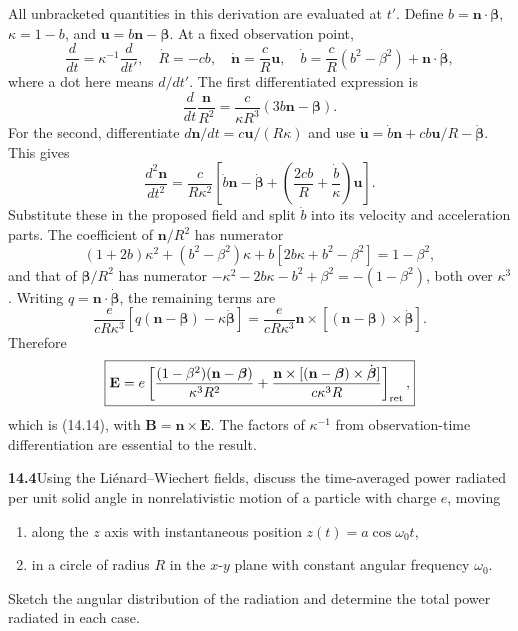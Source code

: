 All unbracketed quantities in this derivation are evaluated at $t'$.
Define $b=\mathbf n\cdot\boldsymbol\beta$, $\kappa=1-b$, and
$\mathbf u=b\mathbf n-\boldsymbol\beta$. At a fixed observation point,
\[
\frac d{dt}=\kappa^{-1}\frac d{dt'},\quad
\dot R=-cb,\quad \dot{\mathbf n}=\frac cR\mathbf u,\quad
\dot b=\frac cR(b^2-\beta^2)+\mathbf n\cdot\dot{\boldsymbol\beta},
\]
where a dot here means $d/dt'$. The first differentiated expression is
\[
\frac d{dt}\frac{\mathbf n}{R^2}
=\frac c{\kappa R^3}(3b\mathbf n-\boldsymbol\beta).
\]
For the second, differentiate $d\mathbf n/dt=c\mathbf u/(R\kappa)$
and use $\dot{\mathbf u}=\dot b\mathbf n+cb\mathbf u/R-
\dot{\boldsymbol\beta}$. This gives
\[
\frac{d^2\mathbf n}{dt^2}
=\frac c{R\kappa^2}\left[
\dot b\mathbf n-\dot{\boldsymbol\beta}
+\left(\frac{2cb}R+\frac{\dot b}{\kappa}\right)\mathbf u\right].
\]
Substitute these in the proposed field and split $\dot b$ into its
velocity and acceleration parts. The coefficient of $\mathbf n/R^2$
has numerator
\[
(1+2b)\kappa^2+(b^2-\beta^2)\kappa
+b[2b\kappa+b^2-\beta^2]=1-\beta^2,
\]
and that of $\boldsymbol\beta/R^2$ has numerator
$-\kappa^2-2b\kappa-b^2+\beta^2=-(1-\beta^2)$, both over $\kappa^3$.
Writing $q=\mathbf n\cdot\dot{\boldsymbol\beta}$, the remaining terms
are
\[
\frac e{cR\kappa^3}
[q(\mathbf n-\boldsymbol\beta)-\kappa\dot{\boldsymbol\beta}]
=\frac e{cR\kappa^3}\mathbf n\times
[(\mathbf n-\boldsymbol\beta)\times\dot{\boldsymbol\beta}].
\]
Therefore
\[
\boxed{\mathbf E=e\left[
\frac{(1-\beta^2)(\mathbf n-\boldsymbol\beta)}{\kappa^3R^2}
+\frac{\mathbf n\times[(\mathbf n-\boldsymbol\beta)
\times\dot{\boldsymbol\beta}]}{c\kappa^3R}\right]_{\rm ret},}
\]
which is (14.14), with $\mathbf B=\mathbf n\times\mathbf E$.
The factors of $\kappa^{-1}$ from observation-time differentiation are
essential to the result.

\par\bigskip
\noindent\textbf{14.4}\quad Using the Li\'enard--Wiechert fields, discuss the time-averaged power radiated per unit solid angle in nonrelativistic motion of a particle with charge $e$, moving
\begin{enumerate}
\item[(a)] along the $z$ axis with instantaneous position $z(t)=a\cos\omega_{0}t$,
\item[(b)] in a circle of radius $R$ in the $x$-$y$ plane with constant angular frequency $\omega_{0}$.
\end{enumerate}
Sketch the angular distribution of the radiation and determine the total power radiated in each case.
\solution


